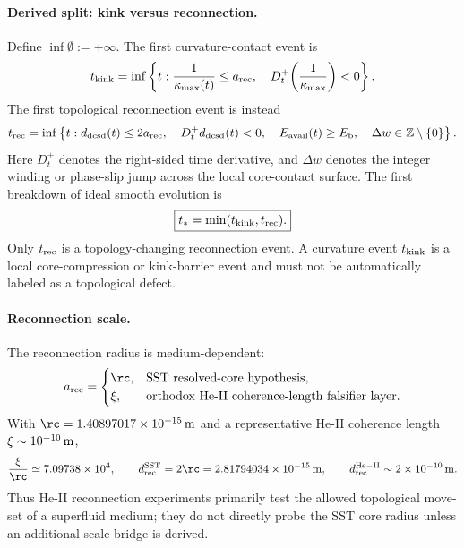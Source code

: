 \paragraph{Derived split: kink versus reconnection.}
Define $\inf\emptyset:=+\infty$. The first curvature-contact event is
\begin{equation}
    t_{\rm kink}
    =
    \inf\left\{
    t:
    \frac{1}{\kappa_{\max}(t)}\le a_{\rm rec},
    \quad
    D_t^+\!\left(\frac{1}{\kappa_{\max}}\right)<0
    \right\}.
    \label{eq:sst_t_kink}
\end{equation}
The first topological reconnection event is instead
\begin{equation}
    t_{\rm rec}
    =
    \inf\left\{
    t:
    d_{\rm dcsd}(t)\le 2a_{\rm rec},
    \quad
    D_t^+d_{\rm dcsd}(t)<0,
    \quad
    E_{\rm avail}(t)\ge E_{\rm b},
    \quad
    \Delta w\in\mathbb Z\setminus\{0\}
    \right\}.
    \label{eq:sst_t_rec}
\end{equation}
Here $D_t^+$ denotes the right-sided time derivative, and $\Delta w$ denotes the integer winding or phase-slip jump across the local core-contact surface. The first breakdown of ideal smooth evolution is
\begin{equation}
    \boxed{
    t_\ast=\min(t_{\rm kink},t_{\rm rec}).
    }
    \label{eq:sst_first_hitting_time}
\end{equation}
Only $t_{\rm rec}$ is a topology-changing reconnection event. A curvature event $t_{\rm kink}$ is a local core-compression or kink-barrier event and must not be automatically labeled as a topological defect.

\paragraph{Reconnection scale.}
The reconnection radius is medium-dependent:
\begin{equation}
    a_{\rm rec}
    =
    \begin{cases}
        \rc, & \text{SST resolved-core hypothesis},\\
        \xi, & \text{orthodox He-II coherence-length falsifier layer}.
    \end{cases}
    \label{eq:sst_reconnection_scale}
\end{equation}
With $\rc=1.40897017\times10^{-15}\,{\rm m}$ and a representative He-II coherence length $\xi\sim10^{-10}\,{\rm m}$,
\begin{equation}
    \frac{\xi}{\rc}
    \simeq
    7.09738\times10^4,
    \qquad
    d_{\rm rec}^{\rm SST}=2\rc=2.81794034\times10^{-15}\,{\rm m},
    \qquad
    d_{\rm rec}^{\rm He-II}\sim2\times10^{-10}\,{\rm m}.
    \label{eq:sst_heii_core_scale_mismatch}
\end{equation}
Thus He-II reconnection experiments primarily test the allowed topological move-set of a superfluid medium; they do not directly probe the SST core radius unless an additional scale-bridge is derived.

